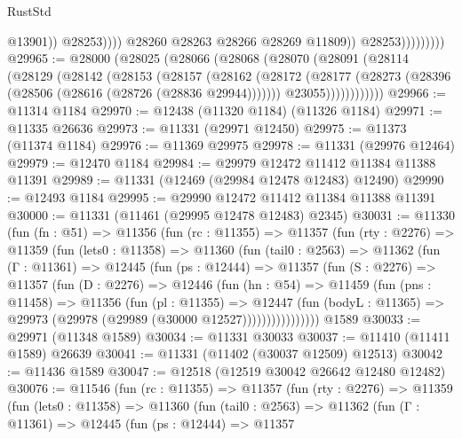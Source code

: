 \begin{lexlean}{RustStd}
\begin{coremodule}
                                      @13901))
                                  @28253))))
                          @28260
                          @28263
                          @28266
                          @28269
                          @11809))
                      @28253)))))))))
@29965 := @28000
    (@28025
      (@28066
        (@28068
          (@28070
            (@28091
              (@28114
                (@28129
                  (@28142
                    (@28153
                      (@28157
                        (@28162
                          (@28172
                            (@28177 (@28273 (@28396 (@28506 (@28616 (@28726 (@28836 @29944)))))))
                            @23055))))))))))))
@29966 := @11314 @1184
@29970 := @12438 (@11320 @1184) (@11326 @1184)
@29971 := @11335 @26636
@29973 := @11331 (@29971 @12450)
@29975 := @11373 (@11374 @1184)
@29976 := @11369 @29975
@29978 := @11331 (@29976 @12464)
@29979 := @12470 @1184
@29984 := @29979 @12472 @11412 @11384 @11388 @11391
@29989 := @11331 (@12469 (@29984 @12478 @12483) @12490)
@29990 := @12493 @1184
@29995 := @29990 @12472 @11412 @11384 @11388 @11391
@30000 := @11331 (@11461 (@29995 @12478 @12483) @2345)
@30031 := @11330
    (fun (fn : @51) =>
    @11356
      (fun (rc : @11355) =>
      @11357
        (fun (rty : @2276) =>
        @11359
          (fun (lets0 : @11358) =>
          @11360
            (fun (tail0 : @2563) =>
            @11362
              (fun (Γ : @11361) =>
              @12445
                (fun (ps : @12444) =>
                @11357
                  (fun (S : @2276) =>
                  @11357
                    (fun (D : @2276) =>
                    @12446
                      (fun (hn : @54) =>
                      @11459
                        (fun (pns : @11458) =>
                        @11356
                          (fun (pl : @11355) =>
                          @12447
                            (fun (bodyL : @11365) =>
                            @29973 (@29978 (@29989 (@30000 @12527))))))))))))))))
    @1589
@30033 := @29971 (@11348 @1589)
@30034 := @11331 @30033
@30037 := @11410 (@11411 @1589) @26639
@30041 := @11331 (@11402 (@30037 @12509) @12513)
@30042 := @11436 @1589
@30047 := @12518 (@12519 @30042 @26642 @12480 @12482)
@30076 := @11546
    (fun (rc : @11355) =>
    @11357
      (fun (rty : @2276) =>
      @11359
        (fun (lets0 : @11358) =>
        @11360
          (fun (tail0 : @2563) =>
          @11362
            (fun (Γ : @11361) =>
            @12445
              (fun (ps : @12444) =>
              @11357

\end{coremodule}
\end{lexlean}
